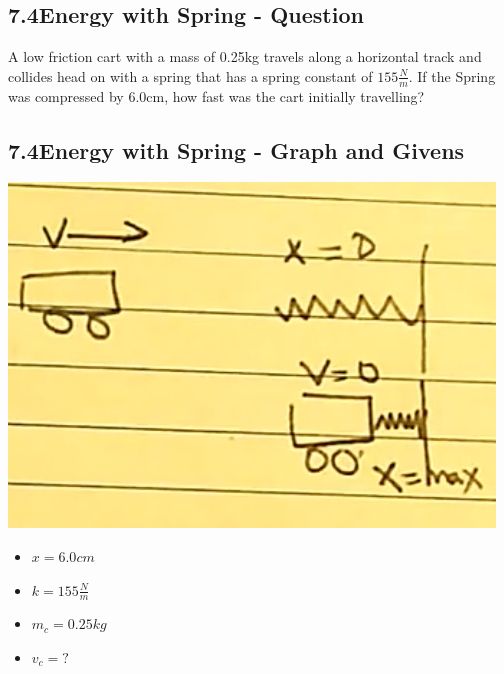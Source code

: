 \subsection*{7.4\hspace*{0.5cm}Energy with Spring - Question}
A low friction cart with a mass of 0.25kg travels along a horizontal track and collides
head on with a spring that has a spring constant of $155\frac{N}{m}$.
If the Spring was compressed by 6.0cm, how fast was the cart initially travelling?
\subsection*{7.4\hspace*{0.5cm}Energy with Spring - Graph and Givens}
\begin{minipage}{0.5\textwidth}
    \includegraphics[scale=0.33]{./images/springs.png}
\end{minipage}
\begin{minipage}{0.5\textwidth}
    \begin{itemize}
        \item $x = 6.0cm$
        \item $k = 155\frac{N}{m}$
        \item $m_{c} = 0.25kg$
        \item $v_{c} = ?$
    \end{itemize}
\end{minipage}
